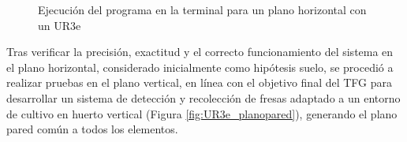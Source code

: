    \begin{figure}[H]
      \begin{center}
        \subcapcentertrue
        \hspace{1mm}
      \end{center}
      \caption{Ejecución del programa en la terminal para un plano horizontal con un UR3e}
      \label{fig:POV_Camara_UR3e_planomesa}
   \end{figure}

Tras verificar la precisión, exactitud y el correcto funcionamiento del sistema en el plano horizontal, considerado inicialmente como hipótesis suelo, se procedió a realizar pruebas en el plano vertical, en línea con el objetivo final del TFG para desarrollar un sistema de detección y recolección de fresas adaptado a un entorno de cultivo en huerto vertical (Figura \ref{fig:UR3e_planopared}), %
generando el plano pared común a todos los elementos. 

